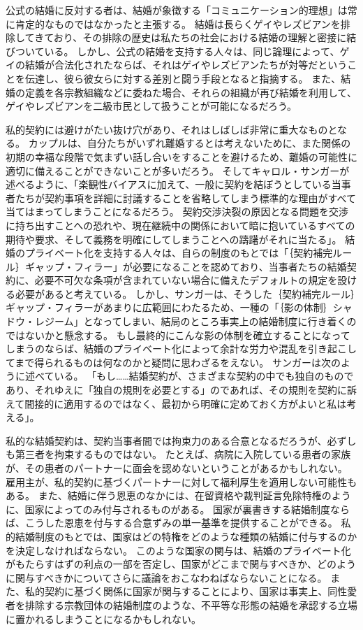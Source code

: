 \documentclass[paper=a4,book,openany]{jlreq}
\begin{document}
公式の結婚に反対する者は、結婚が象徴する「コミュニケーション的理想」は常に肯定的なものではなかったと主張する。
結婚は長らくゲイやレズビアンを排除してきており、その排除の歴史は私たちの社会における結婚の理解と密接に結びついている。
しかし、公式の結婚を支持する人々は、同じ論理によって、ゲイの結婚が合法化されたならば、それはゲイやレズビアンたちが対等だということを伝達し、彼ら彼女らに対する差別と闘う手段となると指摘する。
また、結婚の定義を各宗教組織などに委ねた場合、それらの組織が再び結婚を利用して、ゲイやレズビアンを二級市民として扱うことが可能になるだろう\citep[cf.][p.205]{hartley12:_polit_liber_marriag_famil}。

私的契約には避けがたい抜け穴があり、それはしばしば非常に重大なものとなる。
カップルは、自分たちがいずれ離婚するとは考えないために、また関係の初期の幸福な段階で気まずい話し合いをすることを避けるため、離婚の可能性に適切に備えることができないことが多いだろう。
そしてキャロル・サンガーが述べるように、「楽観性バイアスに加えて、一般に契約を結ぼうとしている当事者たちが契約事項を詳細に討議することを省略してしまう標準的な理由がすべて当てはまってしまうことになるだろう。
契約交渉決裂の原因となる問題を交渉に持ち出すことへの恐れや、現在継続中の関係において暗に抱いているすべての期待や要求、そして義務を明確にしてしまうことへの躊躇がそれに当たる」\citep[p.1315]{sanger06:_case_civil_marriag}。
結婚のプライベート化を支持する人々は、自らの制度のもとでは「｛契約補完ルール｝{ギャップ・フィラー}」が必要になることを認めており、当事者たちの結婚契約に、必要不可欠な条項が含まれていない場合に備えたデフォルトの規定を設ける必要があると考えている。
しかし、サンガーは、そうした｛契約補完ルール｝{ギャップ・フィラー}があまりに広範囲にわたるため、一種の「｛影の体制｝{シャドウ・レジーム}」となってしまい、結局のところ事実上の結婚制度に行き着くのではないかと懸念する。
もし最終的にこんな影の体制を確立することになってしまうのならば、結婚のプライベート化によって余計な労力や混乱を引き起こしてまで得られるものは何なのかと疑問に思わざるをえない。
サンガーは次のように述べている。
「もし……結婚契約が、さまざまな契約の中でも独自のものであり、それゆえに「独自の規則を必要とする」のであれば、その規則を契約に訴えて間接的に適用するのではなく、最初から明確に定めておく方がよいと私は考える」\citep[p.1315]{sanger06:_case_civil_marriag}。

私的な結婚契約は、契約当事者間では拘束力のある合意となるだろうが、必ずしも第三者を拘束するものではない。
たとえば、病院に入院している患者の家族が、その患者のパートナーに面会を認めないということがあるかもしれない。
雇用主が、私的契約に基づくパートナーに対して福利厚生を適用しない可能性もある。
また、結婚に伴う恩恵のなかには、在留資格や裁判証言免除特権のように、国家によってのみ付与されるものがある。
国家が裏書きする結婚制度ならば、こうした恩恵を付与する合意ずみの単一基準を提供することができる。
私的結婚制度のもとでは、国家はどの特権をどのような種類の結婚に付与するのかを決定しなければならない。
このような国家の関与は、結婚のプライベート化がもたらすはずの利点の一部を否定し、国家がどこまで関与すべきか、どのように関与すべきかについてさらに議論をおこなわねばならないことになる。
また、私的契約に基づく関係に国家が関与することにより、国家は事実上、同性愛者を排除する宗教団体の結婚制度のような、不平等な形態の結婚を承認する立場に置かれるしまうことになるかもしれない。
\end{document}
